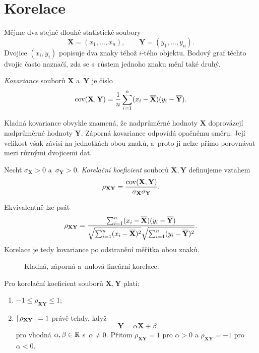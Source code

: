 \section{Korelace}\label{sec:ai-korelace}

Mějme dva stejně dlouhé statistické soubory
\[
    \mathbf{X}=(x_1,\ldots,x_n),
    \qquad
    \mathbf{Y}=(y_1,\ldots,y_n).
\]
Dvojice \((x_i,y_i)\) popisuje dva znaky téhož \(i\)-tého objektu. Bodový graf těchto dvojic často naznačí, zda se s~růstem jednoho znaku mění také druhý.

\begin{definition}\label{def:ai-kovariance}
    \emph{Kovariance} souborů \(\mathbf{X}\) a~\(\mathbf{Y}\) je číslo
    \[
        \operatorname{cov}(\mathbf{X},\mathbf{Y})
        =
        \frac1n\sum_{i=1}^{n}
        (x_i-\overline{\mathbf{X}})
        (y_i-\overline{\mathbf{Y}}).
    \]
\end{definition}

Kladná kovariance obvykle znamená, že nadprůměrné hodnoty \(\mathbf{X}\) doprovázejí nadprůměrné hodnoty \(\mathbf{Y}\). Záporná kovariance odpovídá opačnému směru. Její velikost však závisí na jednotkách obou znaků, a~proto ji nelze přímo porovnávat mezi různými dvojicemi dat.

\begin{definition}\label{def:ai-korelace}
    Nechť \(\sigma_{\mathbf{X}}>0\) a~\(\sigma_{\mathbf{Y}}>0\).
    \emph{Korelační koeficient} souborů \(\mathbf{X},\mathbf{Y}\) definujeme vztahem
    \[
        \rho_{\mathbf{X}\mathbf{Y}}
        =
        \frac{\operatorname{cov}(\mathbf{X},\mathbf{Y})}
        {\sigma_{\mathbf{X}}\sigma_{\mathbf{Y}}}.
    \]
\end{definition}

Ekvivalentně lze psát
\[
    \rho_{\mathbf{X}\mathbf{Y}}
    =
    \frac{
        \sum_{i=1}^{n}
        (x_i-\overline{\mathbf{X}})
        (y_i-\overline{\mathbf{Y}})
    }{
        \sqrt{\sum_{i=1}^{n}(x_i-\overline{\mathbf{X}})^2}
        \sqrt{\sum_{i=1}^{n}(y_i-\overline{\mathbf{Y}})^2}
    }.
\]
Korelace je tedy kovariance po odstranění měřítka obou znaků.

\begin{figure}[ht]
    \centering
    
    \caption{Kladná, záporná a~nulová lineární korelace.}
    \label{fig:ai-korelace}
\end{figure}

\begin{proposition}\label{prop:ai-korelace-vlastnosti}
    Pro korelační koeficient souborů \(\mathbf{X},\mathbf{Y}\) platí:
    \begin{enumerate}
        \item \(-1\leqslant\rho_{\mathbf{X}\mathbf{Y}}\leqslant1\);
        \item \(\left|\,\rho_{\mathbf{X}\mathbf{Y}}\,\right|=1\) právě tehdy, když
        \[
            \mathbf{Y}=\alpha\mathbf{X}+\beta
        \]
        pro vhodná \(\alpha,\beta\in\mathbb{R}\) s~\(\alpha\neq0\).
        Přitom \(\rho_{\mathbf{X}\mathbf{Y}}=1\) pro \(\alpha>0\) a
        \(\rho_{\mathbf{X}\mathbf{Y}}=-1\) pro \(\alpha<0\).
    \end{enumerate}
\end{proposition}

